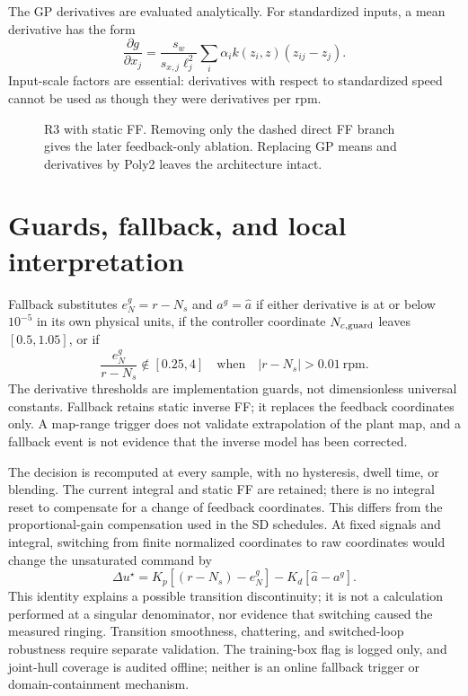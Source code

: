 \documentclass[11pt,a4paper,oneside]{report}
\newcommand{\blockfig}[3]{\begin{figure}[htbp]\centering\resizebox{.98\linewidth}{!}{#1}\caption{#2}\label{fig:#3}\end{figure}}
\begin{document}
The GP derivatives are evaluated analytically. For standardized inputs, a mean derivative has the form
\begin{equation}
\frac{\partial g}{\partial x_j}
=\frac{s_w}{s_{x,j}\ell_j^2}\sum_i\alpha_i k(z_i,z)(z_{ij}-z_j).
\end{equation}
Input-scale factors are essential: derivatives with respect to standardized speed cannot be used as though they were derivatives per rpm.

\blockfig{\diagramRthree}{R3 with static FF. Removing only the dashed direct FF branch gives the later feedback-only ablation. Replacing GP means and derivatives by Poly2 leaves the architecture intact.}{r3}

\section{Guards, fallback, and local interpretation}
Fallback substitutes $e_N^g=r-N_s$ and $a^g=\hat a$ if either derivative is at or below $10^{-5}$ in its own physical units, if the controller coordinate $N_{c,\rm guard}$ leaves $[0.5,1.05]$, or if
\begin{equation}
\frac{e_N^g}{r-N_s}\notin[0.25,4]\quad\text{when}\quad|r-N_s|>0.01\ \mathrm{rpm}.
\end{equation}
The derivative thresholds are implementation guards, not dimensionless universal constants. Fallback retains static inverse FF; it replaces the feedback coordinates only. A map-range trigger does not validate extrapolation of the plant map, and a fallback event is not evidence that the inverse model has been corrected.

The decision is recomputed at every sample, with no hysteresis, dwell time, or blending. The current integral and static FF are retained; there is no integral reset to compensate for a change of feedback coordinates. This differs from the proportional-gain compensation used in the SD schedules. At fixed signals and integral, switching from finite normalized coordinates to raw coordinates would change the unsaturated command by
\begin{equation}
\Delta u^\star=K_p[(r-N_s)-e_N^g]-K_d[\hat a-a^g].
\end{equation}
This identity explains a possible transition discontinuity; it is not a calculation performed at a singular denominator, nor evidence that switching caused the measured ringing. Transition smoothness, chattering, and switched-loop robustness require separate validation. The training-box flag is logged only, and joint-hull coverage is audited offline; neither is an online fallback trigger or domain-containment mechanism.
\end{document}
